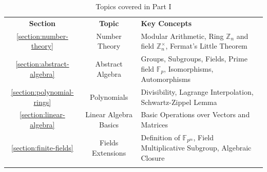 \documentclass{article}
\begin{document}
\begin{table}[H]
    \centering
    \begin{tabularx}{\textwidth}{ccX}
        \Xhline{3\arrayrulewidth}
        \rowcolor{blue!30}\textbf{Section} & \textbf{Topic} & \textbf{Key Concepts} \\
        \Xhline{3\arrayrulewidth}
        \rowcolor{blue!10}\ref{section:number-theory} & Number Theory & Modular
        Arithmetic, Ring $\mathbb{Z}_n$ and field $\mathbb{Z}_n^{\times}$,
        Fermat's Little Theorem \\
        \hline
        \rowcolor{blue!20}\ref{section:abstract-algebra} & Abstract Algebra &
        Groups, Subgroups, Fields, Prime field $\mathbb{F}_p$, Isomorphisms,
        Automorphisms \\
        \hline
        \rowcolor{blue!10}\ref{section:polynomial-rings} & Polynomials & Divisibility, Lagrange Interpolation, Schwartz-Zippel Lemma \\
        \hline
        \rowcolor{blue!20}\ref{section:linear-algebra} & Linear Algebra Basics & Basic Operations over Vectors and Matrices \\
        \hline
        \rowcolor{blue!10}\ref{section:finite-fields} & Fields Extensions & Definition of $\mathbb{F}_{p^m}$, Field Multiplicative Subgroup, Algebraic Closure \\
        \Xhline{3\arrayrulewidth}
    \end{tabularx}
    \caption{Topics covered in Part I}
    \label{tab:essentialls}
\end{table}
\end{document}
